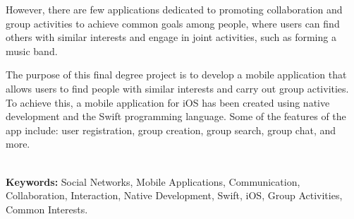 \documentclass{book}
\begin{document}
However, there are few applications dedicated to promoting collaboration 
and group activities to achieve common goals among people, where users can 
find others with similar interests and engage in joint activities, such as 
forming a music band.

The purpose of this final degree project is to develop a mobile application 
that allows users to find people with similar interests and carry out group 
activities. To achieve this, a mobile application for iOS has been created 
using native development and the Swift programming language. Some of the 
features of the app include: user registration, group creation, group search, 
group chat, and more.

\textbf{\\\large Keywords: } Social Networks, Mobile Applications, Communication, Collaboration, Interaction, Native Development, Swift, iOS, Group Activities, Common Interests.
\endgroup
\begin{comment}
\begin{table}[ht]
    \centering
    \begin{tabular}{|m{3cm}|m{10cm}|}
        \hline
        \rowcolor{blue!20} Primary Actors        & Usuario                   \\
        \hline
        Level                                    & N/A                       \\
        \hline
        \rowcolor{blue!20} Complexity            & Low                       \\
        \hline
        Use Case Status                          & N/A                       \\
        \hline
        \rowcolor{blue!20} Implementation Status & N/A                       \\
        \hline
        Preconditions                            & N/A                       \\
        \hline
        \rowcolor{blue!20} Post-conditions       & N/A                       \\
        \hline
        Author                                   & Matvey Dergunov Bushmanov \\
        \hline
        \rowcolor{blue!20} Assumptions           & N/A                       \\
        \hline
    \end{tabular}
    \caption{Abandonar grupo Requirements Spec}
\end{table}
\end{comment}
\tableofcontents
\end{document}
